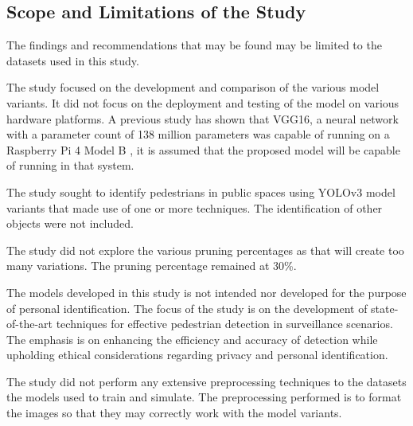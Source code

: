 \subsection{Scope and Limitations of the Study}
The findings and recommendations that may be found may be limited to the datasets used in this study.

The study focused on the development and comparison of the various model variants. It did not focus on the deployment and testing of the model on various hardware platforms. A previous study has shown that VGG16, a neural network with a parameter count of 138 million parameters \cite{simonyanVeryDeepConvolutional2015} was capable of running on a Raspberry Pi 4 Model B \cite{lopezRealtimeFaceMask2021}, it is assumed that the proposed model will be capable of running in that system. 

The study sought to identify pedestrians in public spaces using YOLOv3 model variants that made use of one or more techniques. The identification of other objects were not included.

The study did not explore the various pruning percentages as that will create too many variations. The pruning percentage remained at 30\%.

The models developed in this study is not intended nor developed for the purpose of personal identification. The focus of the study is on the development of state-of-the-art techniques for effective pedestrian detection in surveillance scenarios. The emphasis is on enhancing the efficiency and accuracy of detection while upholding ethical considerations regarding privacy and personal identification.

The study did not perform any extensive preprocessing techniques to the datasets the models used to train and simulate. The preprocessing performed is to format the images so that they may correctly work with the model variants.